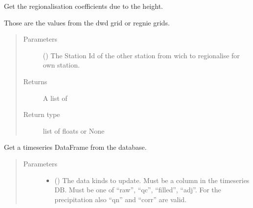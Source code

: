 \documentclass[letterpaper,10pt,english]{sphinxmanual}
\begin{document}
\begin{fulllineitems}
\begin{fulllineitems}
\label{\detokenize{weatherDB:weatherDB.station.StationBase.get_coef}}
\sphinxAtStartPar
Get the regionalisation coefficients due to the height.

\sphinxAtStartPar
Those are the values from the dwd grid or regnie grids.
\begin{quote}\begin{description}
\item[{Parameters}] \leavevmode
\sphinxAtStartPar
{} () \textendash{} The Station Id of the other station from wich to regionalise for own station.

\item[{Returns}] \leavevmode
\sphinxAtStartPar
A list of

\item[{Return type}] \leavevmode
\sphinxAtStartPar
list of floats or None

\end{description}\end{quote}

\end{fulllineitems}


\begin{fulllineitems}
\label{\detokenize{weatherDB:weatherDB.station.StationBase.get_df}}
\sphinxAtStartPar
Get a timeseries DataFrame from the database.
\begin{quote}\begin{description}
\item[{Parameters}] \leavevmode\begin{itemize}
\item {} 
\sphinxAtStartPar
{} () \textendash{} The data kinds to update.
Must be a column in the timeseries DB.
Must be one of “raw”, “qc”, “filled”, “adj”.
For the precipitation also “qn” and “corr” are valid.


\end{itemize}
\end{description}
\end{quote}
\end{fulllineitems}
\end{fulllineitems}
\end{document}
